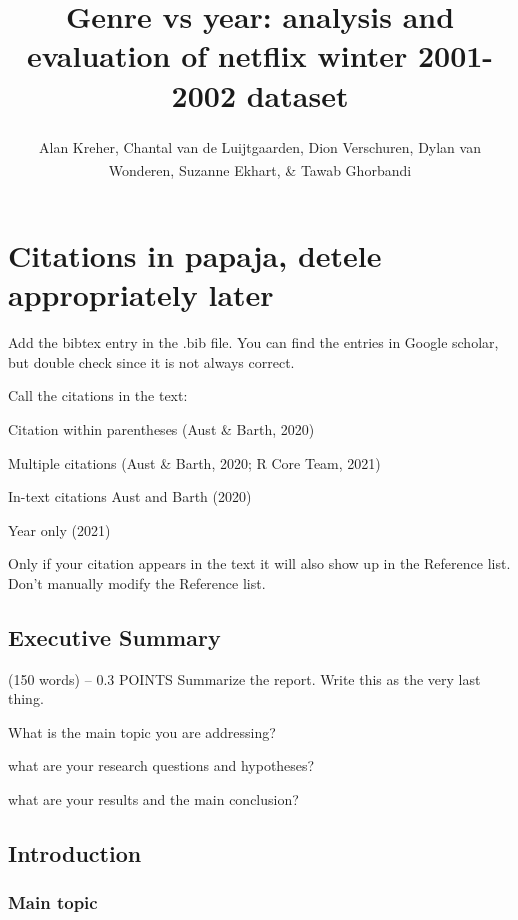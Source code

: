 \documentclass[
  english,
  man,floatsintext]{apa6}
\title{Genre vs year: analysis and evaluation of netflix winter 2001-2002 dataset}
\author{Alan Kreher\textsuperscript{}, Chantal van de Luijtgaarden\textsuperscript{}, Dion Verschuren\textsuperscript{}, Dylan van Wonderen\textsuperscript{}, Suzanne Ekhart\textsuperscript{}, \& Tawab Ghorbandi\textsuperscript{}}
\date{}
\affiliation{\vspace{0.5cm}\textsuperscript{1} Jheronimus Academy of Data Science\\\textsuperscript{2} Eindhoven University of Technology\\\textsuperscript{3} Tilburg University}
\begin{document}
\maketitle

{
\setcounter{tocdepth}{3}
\tableofcontents
}
\hypertarget{citations-in-papaja-detele-appropriately-later}{%
\section{Citations in papaja, detele appropriately later}\label{citations-in-papaja-detele-appropriately-later}}

Add the bibtex entry in the .bib file. You can find the entries in Google scholar,
but double check since it is not always correct.

Call the citations in the text:

Citation within parentheses (Aust \& Barth, 2020)

Multiple citations (Aust \& Barth, 2020; R Core Team, 2021)

In-text citations Aust and Barth (2020)

Year only (2021)

Only if your citation appears in the text it will also show up in the Reference
list. Don't manually modify the Reference list.

\hypertarget{executive-summary}{%
\subsection{Executive Summary}\label{executive-summary}}

(150 words) -- 0.3 POINTS
Summarize the report. Write this as the very last thing.

What is the main topic you are addressing?

what are your research questions and hypotheses?

what are your results and the main conclusion?

\hypertarget{introduction}{%
\subsection{Introduction}\label{introduction}}

\hypertarget{main-topic}{%
\subsubsection{Main topic}\label{main-topic}}
\end{document}
